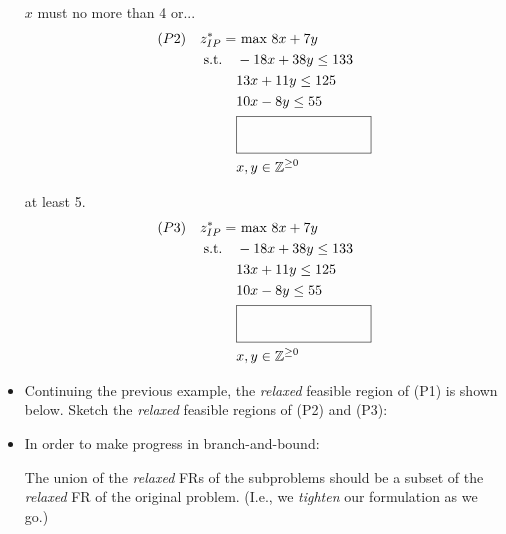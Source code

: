 \documentclass[11pt]{article}
\theoremstyle{definition}
\newcommand{\answerbox}[3]{%
  \fbox{%
    \begin{minipage}[#1]{#2}
      \hfill\vspace{#3}
    \end{minipage}
  }
}
\newcommand{\wordbox}{\answerbox{c}{1.2in}{.7cm}}
\begin{document}
\begin{itemize}
\begin{minipage}{0.5\textwidth}
\hspace{1.3cm}$x$ must no more than 4 or...
    \begin{align*}
    (P2) ~~~ z_{IP}^* = & \text{ max } 8x + 7y\\
      \text{s.t.} \quad & -18x + 38y \leq 133\\
                       & 13x + 11y \leq 125\\
                       & 10x -    8y \leq 55\\
                       & \wordbox \\
                       & x, y \in \mathbb{Z}^{\geq 0}
    \end{align*}
\end{minipage}
\begin{minipage}{0.5\textwidth}
\hspace{1.3cm}at least 5.
    \begin{align*}
    (P3) ~~~ z_{IP}^* = & \text{ max } 8x + 7y\\
      \text{s.t.} \quad & -18x + 38y \leq 133\\
                       & 13x + 11y \leq 125\\
                       & 10x -    8y \leq 55\\
                       & \wordbox \\
                       & x, y \in \mathbb{Z}^{\geq 0}
    \end{align*}
\end{minipage}


\newpage
\item Continuing the previous example, the \emph{relaxed} feasible region of (P1) is shown below.
Sketch the \emph{relaxed} feasible regions of (P2) and (P3):



\item  In order to make progress in branch-and-bound: 

The union of the \emph{relaxed} FRs of the subproblems should be a \wordbox subset of the \emph{relaxed} FR of the original problem.  (I.e., we \emph{tighten} our formulation as we go.)

\end{itemize}
\end{document}
